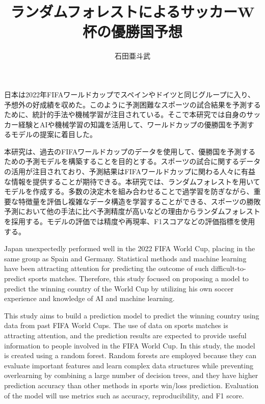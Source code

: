 \documentclass[platex]{suribt}
\title{ランダムフォレストによるサッカーW杯の優勝国予想}
\author{石田亜斗武}
\begin{document}
\maketitle%


\frontmatter%
\begin{jabstract}%
  日本は2022年FIFAワールドカップでスペインやドイツと同じグループに入り、予想外の好成績を収めた。このように予測困難なスポーツの試合結果を予測するために、統計的手法や機械学習が注目されている。そこで本研究では自身のサッカー経験とAIや機械学習の知識を活用して、ワールドカップの優勝国を予測するモデルの提案に着目した。\par
  本研究は、過去のFIFAワールドカップのデータを使用して、優勝国を予測するための予測モデルを構築することを目的とする。スポーツの試合に関するデータの活用が注目されており、予測結果はFIFAワールドカップに関わる人々に有益な情報を提供することが期待できる。本研究では、ランダムフォレストを用いてモデルを作成する。多数の決定木を組み合わせることで過学習を防ぎながら、重要な特徴量を評価し複雑なデータ構造を学習することができる、スポーツの勝敗予測において他の手法に比べ予測精度が高いなどの理由からランダムフォレストを採用する。モデルの評価では精度や再現率、F1スコアなどの評価指標を使用する。
\end{jabstract}

\newpage

\begin{eabstract}%
  Japan unexpectedly performed well in the 2022 FIFA World Cup, placing in the same group as Spain and Germany. Statistical methods and machine learning have been attracting attention for predicting the outcome of such difficult-to-predict sports matches. Therefore, this study focused on proposing a model to predict the winning country of the World Cup by utilizing his own soccer experience and knowledge of AI and machine learning.\par
  This study aims to build a prediction model to predict the winning country using data from past FIFA World Cups. The use of data on sports matches is attracting attention, and the prediction results are expected to provide useful information to people involved in the FIFA World Cup. In this study, the model is created using a random forest. Random forests are employed because they can evaluate important features and learn complex data structures while preventing overlearning by combining a large number of decision trees, and they have higher prediction accuracy than other methods in sports win/loss prediction. Evaluation of the model will use metrics such as accuracy, reproducibility, and F1 score.
\end{eabstract}
\end{document}
